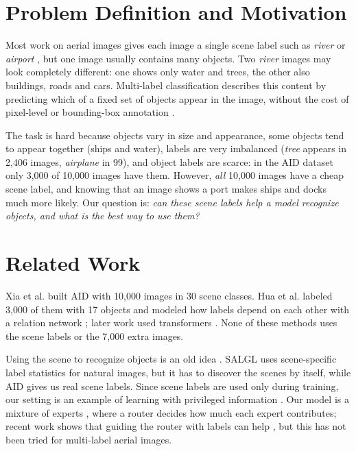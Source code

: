\documentclass[9pt, conference, a4paper]{IEEEtran}
\begin{document}
\section{Problem Definition and Motivation}
Most work on aerial images gives each image a single scene label such as \textit{river} or \textit{airport} \cite{xia2017aid}, but one image usually contains many objects. Two \textit{river} images may look completely different: one shows only water and trees, the other also buildings, roads and cars. Multi-label classification describes this content by predicting which of a fixed set of objects appear in the image, without the cost of pixel-level or bounding-box annotation \cite{hua2020relation}.

The task is hard because objects vary in size and appearance, some objects tend to appear together (ships and water), labels are very imbalanced (\textit{tree} appears in 2,406 images, \textit{airplane} in 99), and object labels are scarce: in the AID dataset only 3,000 of 10,000 images have them. However, \emph{all} 10,000 images have a cheap scene label, and knowing that an image shows a port makes ships and docks much more likely. Our question is: \textit{can these scene labels help a model recognize objects, and what is the best way to use them?}

\section{Related Work}
Xia et al. \cite{xia2017aid} built AID with 10,000 images in 30 scene classes. Hua et al. labeled 3,000 of them with 17 objects and modeled how labels depend on each other with a relation network \cite{hua2020relation}; later work used transformers \cite{wu2022smat}. None of these methods uses the scene labels or the 7,000 extra images.

Using the scene to recognize objects is an old idea \cite{torralba2010forest}. SALGL \cite{zhu2023salgl} uses scene-specific label statistics for natural images, but it has to discover the scenes by itself, while AID gives us real scene labels. Since scene labels are used only during training, our setting is an example of learning with privileged information \cite{vapnik2009lupi}. Our model is a mixture of experts \cite{jacobs1991moe}, where a router decides how much each expert contributes; recent work shows that guiding the router with labels can help \cite{zeng2026med}, but this has not been tried for multi-label aerial images.
\end{document}
